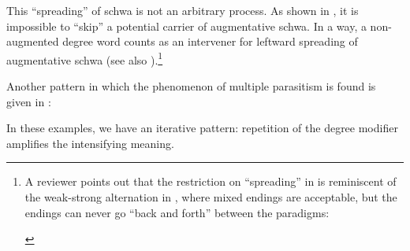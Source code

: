 \documentclass[output=paper]{langsci/langscibook}
\begin{document}
This \enquote{spreading} of schwa is not an arbitrary process. As shown in
, it is impossible to \enquote{skip} a potential carrier of
augmentative schwa. In a way, a non-augmented degree word counts as an
intervener for leftward spreading of augmentative schwa (see also
\citealt{Corver1997a,Broekhuis2013}).\footnote{A reviewer points out
    that the restriction on \enquote{spreading} in  is
    reminiscent of the weak-strong alternation in , where mixed endings
    are acceptable, but the endings can never go \enquote{back and forth}
    between the paradigms:

\begin{exe}
    \begin{xlist}
    \end{xlist}
\end{exe}}

\newpage
\ea%
    \label{ex:key:18.18}
	\z
\z

Another pattern in which the phenomenon of multiple parasitism is found is
given in :

\ea%
    \label{ex:key:18.19}
	\z
\z

In these examples, we have an iterative pattern: repetition of the degree
modifier amplifies the intensifying meaning.
\end{document}
